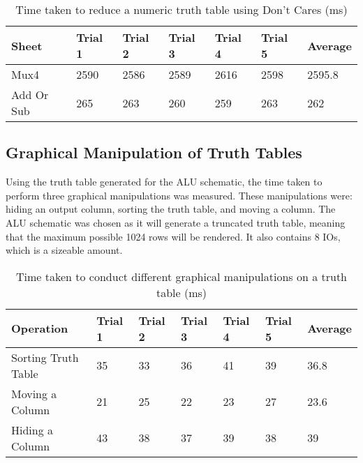 \begin{table}[!ht]
    \centering
    \begin{tabular}{|l|l|l|l|l|l|l|}
    \hline
        Sheet & Trial 1 & Trial 2 & Trial 3 & Trial 4 & Trial 5 & Average \\ \hline
        Mux4 & 2590 & 2586 & 2589 & 2616 & 2598 & 2595.8 \\ \hline
        Add Or Sub & 265 & 263 & 260 & 259 & 263 & 262 \\ \hline
    \end{tabular}
    \caption{Time taken to reduce a numeric truth table using Don't Cares (ms)}
    \label{tab:timeDCTT}
\end{table}

\subsection{Graphical Manipulation of Truth Tables}
Using the truth table generated for the ALU schematic, the time taken to perform three graphical manipulations was measured. These manipulations were: hiding an output column, sorting the truth table, and moving a column. The ALU schematic was chosen as it will generate a truncated truth table, meaning that the maximum possible 1024 rows will be rendered. It also contains 8 IOs, which is a sizeable amount.

\begin{table}[!ht]
    \centering
    \begin{tabular}{|l|l|l|l|l|l|l|}
    \hline
        Operation & Trial 1 & Trial 2 & Trial 3 & Trial 4 & Trial 5 & Average \\ \hline
        Sorting Truth Table & 35 & 33 & 36 & 41 & 39 & 36.8 \\ \hline
        Moving a Column & 21 & 25 & 22 & 23 & 27 & 23.6 \\ \hline
        Hiding a Column & 43 & 38 & 37 & 39 & 38 & 39 \\ \hline
    \end{tabular}
    \caption{Time taken to conduct different graphical manipulations on a truth table (ms)}
    \label{tab:timeTTManip}
\end{table}